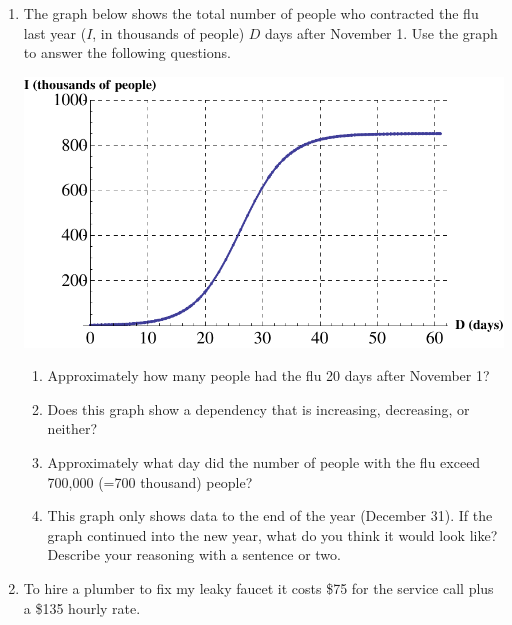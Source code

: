 \documentclass[12pt]{article}
\begin{document}
\hrulefill


\newpage
\begin{enumerate}
\item The graph below shows the total number of people who contracted the flu last year ($I$, in thousands of people) $D$ days after November 1.  Use the graph to answer the following questions.

\begin{center}
 {\includegraphics [width = 8in] {flu}}
\end{center}



\begin{enumerate}
\item Approximately how many people had the flu 20 days after November 1? 
\vfill
\item Does this graph show a dependency that is increasing, decreasing, or neither?
\vfill
\item Approximately what day did the number of people with the flu exceed 700,000 (=700 thousand) people?
\vfill
\item This graph only shows data to the end of the year (December 31).  If the graph continued into the new year, what do you think it would look like?  Describe your reasoning with a sentence or two.
\vfill
\end{enumerate}
\newpage
\item  To hire a plumber to fix my leaky faucet it costs \$75 for the service call plus a \$135 hourly rate.


\end{enumerate}
\end{document}
